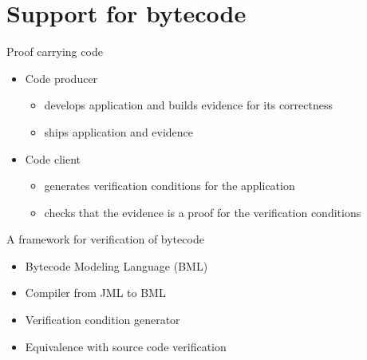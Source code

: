 \documentclass[final,nocolorBG,a4,mobius,nototal,pdf,slideColor]{prosper}
\begin{document}

\part{Support for bytecode}
\begin{slide}{Proof carrying code}
\begin{itemize}
\item Code producer 
 \begin{itemize}
 \item develops application and builds evidence for its correctness 
 \item ships application and evidence 
 \end{itemize}
\item Code client  
 \begin{itemize}
 \item generates verification conditions for the application
 \item checks that the evidence is a proof for the verification
conditions  
 \end{itemize}
\end{itemize}
\end{slide}

\begin{slide}{A framework for verification of bytecode}
 \begin{itemize}
 \item Bytecode Modeling Language (BML)
 \item Compiler from JML to BML
 \item Verification condition generator
 \item Equivalence with source code verification
 \end{itemize}
\end{slide}
\end{document}
